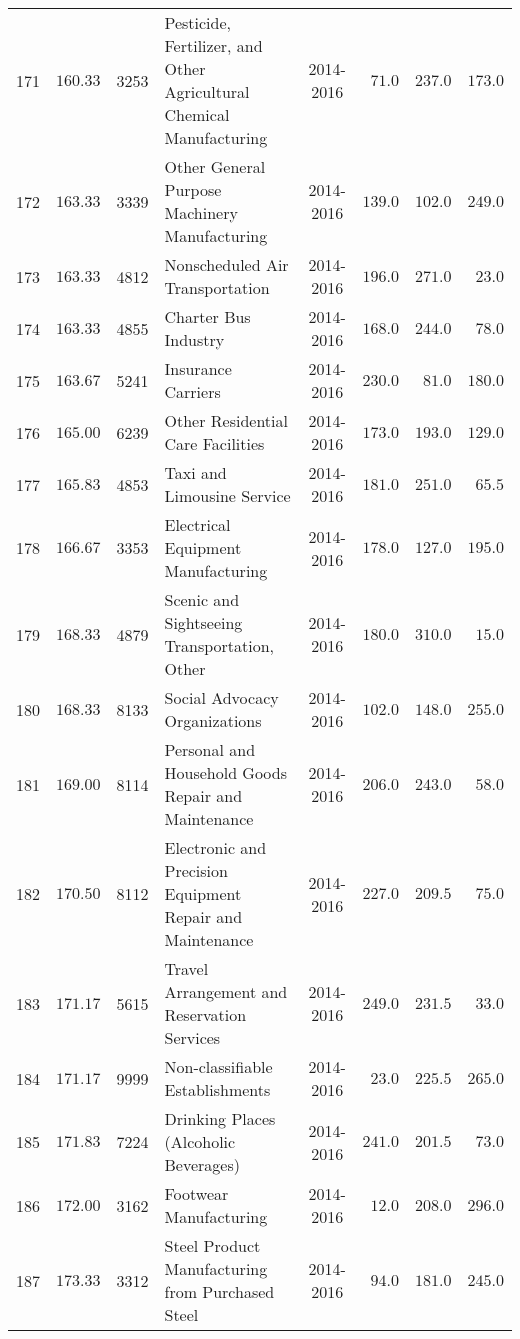 \documentclass[9pt, oneside]{article}   	%
\begin{document}
\begin{longtable}{cccp{2.0in}cccc}
171  & $160.33$ & 3253 & Pesticide, Fertilizer, and Other Agricultural Chemical Manufacturing & 2014-2016 & $\phantom{0}71.0$ & $237.0$ & $173.0$ \\
172  & $163.33$ & 3339 & Other General Purpose Machinery Manufacturing & 2014-2016 & $139.0$ & $102.0$ & $249.0$ \\
173  & $163.33$ & 4812 & Nonscheduled Air Transportation & 2014-2016 & $196.0$ & $271.0$ & $\phantom{0}23.0$ \\
174  & $163.33$ & 4855 & Charter Bus Industry & 2014-2016 & $168.0$ & $244.0$ & $\phantom{0}78.0$ \\
175  & $163.67$ & 5241 & Insurance Carriers & 2014-2016 & $230.0$ & $\phantom{0}81.0$ & $180.0$ \\
176  & $165.00$ & 6239 & Other Residential Care Facilities & 2014-2016 & $173.0$ & $193.0$ & $129.0$ \\
177  & $165.83$ & 4853 & Taxi and Limousine Service & 2014-2016 & $181.0$ & $251.0$ & $\phantom{0}65.5$ \\
178  & $166.67$ & 3353 & Electrical Equipment Manufacturing & 2014-2016 & $178.0$ & $127.0$ & $195.0$ \\
179  & $168.33$ & 4879 & Scenic and Sightseeing Transportation, Other & 2014-2016 & $180.0$ & $310.0$ & $\phantom{0}15.0$ \\
180  & $168.33$ & 8133 & Social Advocacy Organizations & 2014-2016 & $102.0$ & $148.0$ & $255.0$ \\
181  & $169.00$ & 8114 & Personal and Household Goods Repair and Maintenance & 2014-2016 & $206.0$ & $243.0$ & $\phantom{0}58.0$ \\
182  & $170.50$ & 8112 & Electronic and Precision Equipment Repair and Maintenance & 2014-2016 & $227.0$ & $209.5$ & $\phantom{0}75.0$ \\
183  & $171.17$ & 5615 & Travel Arrangement and Reservation Services & 2014-2016 & $249.0$ & $231.5$ & $\phantom{0}33.0$ \\
184  & $171.17$ & 9999 & Non-classifiable Establishments & 2014-2016 & $\phantom{0}23.0$ & $225.5$ & $265.0$ \\
185  & $171.83$ & 7224 & Drinking Places (Alcoholic Beverages) & 2014-2016 & $241.0$ & $201.5$ & $\phantom{0}73.0$ \\
186  & $172.00$ & 3162 & Footwear Manufacturing & 2014-2016 & $\phantom{0}12.0$ & $208.0$ & $296.0$ \\
187  & $173.33$ & 3312 & Steel Product Manufacturing from Purchased Steel & 2014-2016 & $\phantom{0}94.0$ & $181.0$ & $245.0$ \\

\end{longtable}
\end{document}
